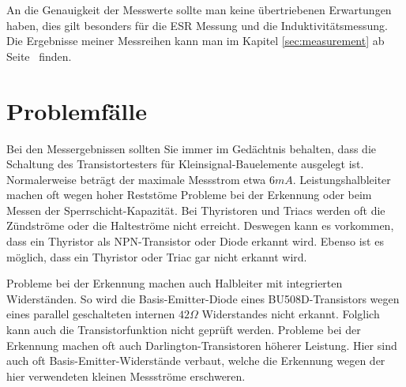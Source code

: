 An die Genauigkeit der Messwerte sollte man keine übertriebenen Erwartungen haben, dies gilt besonders
für die ESR Messung und die Induktivitätsmessung.
Die Ergebnisse meiner Messreihen kann man im Kapitel \ref{sec:measurement} ab Seite~\pageref{sec:measurement} finden.



\section{Problemfälle}
Bei den Messergebnissen sollten Sie immer im Gedächtnis behalten, dass die Schaltung des Transistortesters für
Kleinsignal-Bauelemente ausgelegt ist. Normalerweise beträgt der maximale Messstrom etwa \(6mA\).
Leistungshalbleiter machen oft wegen hoher Reststöme Probleme bei der Erkennung oder beim Messen der
Sperrschicht-Kapazität.
Bei Thyristoren und Triacs werden oft die Zündströme oder die Halteströme nicht erreicht. Deswegen kann es
vorkommen, dass ein Thyristor als NPN-Transistor oder Diode erkannt wird. Ebenso ist es möglich, dass ein 
Thyristor oder Triac gar nicht erkannt wird.

Probleme bei der Erkennung machen auch Halbleiter mit integrierten Widerständen.
So wird die Basis-Emitter-Diode eines BU508D-Transistors wegen eines parallel geschalteten internen
\(42 \Omega\) Widerstandes nicht erkannt.
Folglich kann auch die Transistorfunktion nicht geprüft werden.
Probleme bei der Erkennung machen oft auch Darlington-Transistoren höherer Leistung. Hier sind auch
oft Basis-Emitter-Widerstände verbaut, welche die Erkennung wegen der hier verwendeten kleinen Messströme erschweren.

